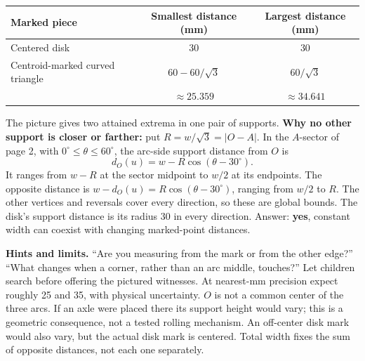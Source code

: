 \documentclass[11pt,letterpaper]{article}
\newcommand{\lead}[1]{\textbf{#1}}
\newcommand{\reuleaux}{\draw[line width=.6pt] (60,0) arc[start angle=0,end angle=60,radius=60] arc[start angle=120,end angle=180,radius=60] arc[start angle=240,end angle=300,radius=60] -- cycle;}
\begin{document}
\begin{center}
\begin{tabular}{lcc}
\toprule Marked piece & Smallest distance (mm) & Largest distance (mm)\\\midrule
Centered disk & 30 & 30\\
Centroid-marked curved triangle & $60-60/\sqrt3$ & $60/\sqrt3$\\
 & $\approx25.359$ & $\approx34.641$\\\bottomrule
\end{tabular}
\end{center}
\begin{center}
\end{center}
The picture gives two attained extrema in one pair of supports. \lead{Why no other support is closer or farther:} put $R=w/\sqrt3=|O-A|$. In the $A$-sector of page 2, with $0^\circ\le\theta\le60^\circ$, the arc-side support distance from $O$ is
\[
 d_O(u)=w-R\cos(\theta-30^\circ).
\]
It ranges from $w-R$ at the sector midpoint to $w/2$ at its endpoints. The opposite distance is $w-d_O(u)=R\cos(\theta-30^\circ)$, ranging from $w/2$ to $R$. The other vertices and reversals cover every direction, so these are global bounds. The disk's support distance is its radius 30 in every direction. Answer: \textbf{yes}, constant width can coexist with changing marked-point distances.

\lead{Hints and limits.} ``Are you measuring from the mark or from the other edge?'' ``What changes when a corner, rather than an arc middle, touches?'' Let children search before offering the pictured witnesses. At nearest-mm precision expect roughly 25 and 35, with physical uncertainty. $O$ is not a common center of the three arcs. If an axle were placed there its support height would vary; this is a geometric consequence, not a tested rolling mechanism. An off-center disk mark would also vary, but the actual disk mark is centered. Total width fixes the sum of opposite distances, not each one separately.
\end{document}
